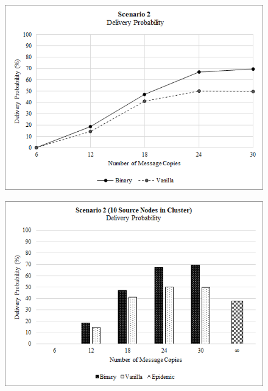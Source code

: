 \documentclass{article}
\begin{document}
\begin{figure}[h!]

\thispagestyle{empty}
\captionsetup{justification=centering, font=footnotesize}

\centering
\begin{minipage}[t]{.5\textwidth}
  \centering
  \includegraphics[width=.98\linewidth]{Results/Graphs/DeliveryProbability/S2_DeliveryProbability_SprayAndWaitComparison.png}
  \label{fig:test1}
\end{minipage}%
\begin{minipage}[t]{.5\textwidth}
  \centering
  \includegraphics[width=.98\linewidth]{Results/Graphs/DeliveryProbability/S2_DeliveryProbability_AllComparison.png}
  \label{fig:test2}
\end{minipage}


\end{figure}
\end{document}

